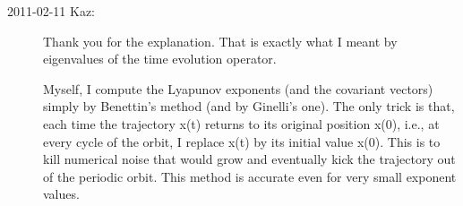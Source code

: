 \begin{description}
\item[2011-02-11 Kaz:] Thank you for the explanation. That is exactly what 
I meant by eigenvalues of the time evolution operator.

Myself, I compute the Lyapunov exponents (and the covariant vectors) simply 
by Benettin's method (and by Ginelli's one). The only trick is that, each time 
the trajectory x(t) returns to its original position x(0), i.e., at every cycle 
of the orbit, I replace x(t) by its initial value x(0). This is to kill 
numerical noise that would grow and eventually kick the trajectory 
out of the periodic orbit. This method is accurate even for very small 
exponent values.

\end{description}



\renewcommand{\ssp}{a}
